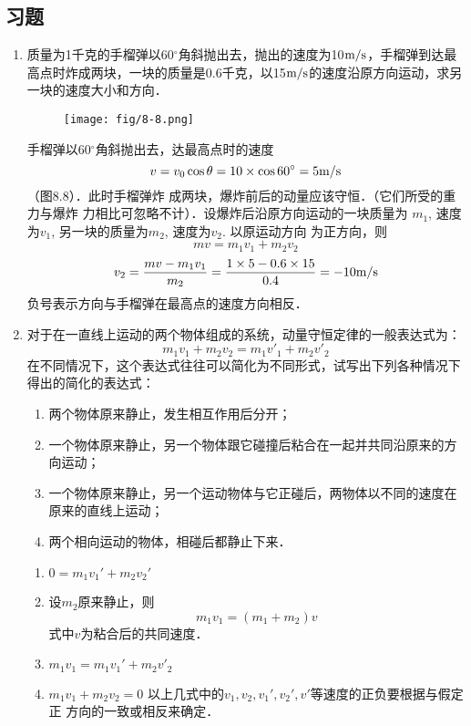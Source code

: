 \subsection{习题}
\begin{enumerate}
    \item 质量为1千克的手榴弹以60$^\circ$角斜抛出去，抛出的速度为10$\text{m}/\text{s}$，手榴弹到达最高点时炸成两块，一块的质量是0.6千克，以15$\text{m}/\text{s}$的速度沿原方向运动，求另一块的速度大小和方向．

\begin{figure}[htp]
    \centering
    \texttt{[image: fig/8-8.png]}
    \caption{}
\end{figure}

    \begin{solution}
手榴弹以60$^\circ$角斜抛出去，达最高点时的速度
\[v=v_0\cos\theta=10\times\cos60^{\circ}=5\text{m}/\text{s}\]
（图8.8）．此时手榴弹炸
成两块，爆炸前后的动量应该守恒．（它们所受的重力与爆炸
力相比可忽略不计）．设爆炸后沿原方向运动的一块质量为
$m_1$, 速度为$v_1$, 另一块的质量为$m_2$, 速度为$v_2$. 以原运动方向
为正方向，则
\[mv=m_1v_1+m_2v_2\]
\[v_2=\frac{mv-m_1v_1}{m_2}=\frac{1\times 5-0.6\times 15}{0.4}=-10\text{m}/\text{s}\]
负号表示方向与手榴弹在最高点的速度方向相反．
    \end{solution}
    \item 对于在一直线上运动的两个物体组成的系统，动量守恒定律的一般表达式为：
\[m_1v_1+m_2v_2=m_1v'_1+m_2v'_2 \]
    在不同情况下，这个表达式往往可以简化为不同形式，试写出下列各种情况下得出的简化的表达式：
\begin{enumerate}
    \item 两个物体原来静止，发生相互作用后分开；
    \item 一个物体原来静止，另一个物体跟它碰撞后粘合在一起并共同沿原来的方向运动；
    \item 一个物体原来静止，另一个运动物体与它正碰后，两物体以不同的速度在原来的直线上运动；
    \item 两个相向运动的物体，相碰后都静止下来．
\end{enumerate}

\begin{solution}
\begin{enumerate}
    \item $0=m_1v_1'+m_2v_2'$
\item 设$m_2$原来静止，则
\[m_1v_1=(m_1+m_2)v\]
式中$v$为粘合后的共同速度．
\item $m_1v_1=m_1v_1'+m_2v'_2$
\item $m_1v_1+m_2v_2=0$
以上几式中的$v_1,v_2,v_1',v_2',v'$等速度的正负要根据与假定正
方向的一致或相反来确定．


\end{enumerate}
\end{solution}
\end{enumerate}
